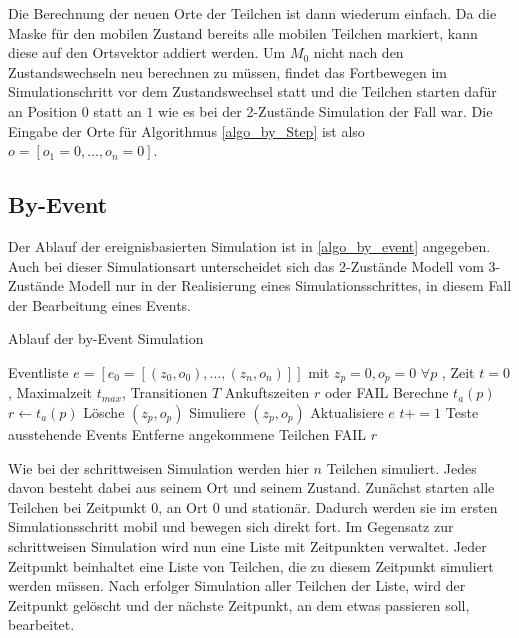 Die Berechnung der neuen Orte der Teilchen ist dann wiederum einfach. Da die Maske für den mobilen Zustand bereits alle mobilen Teilchen markiert, kann diese auf den Ortsvektor addiert werden. Um $M_0$ nicht nach den Zustandswechseln neu berechnen zu müssen, findet das Fortbewegen im Simulationschritt vor dem Zustandswechsel statt und die Teilchen starten dafür an Position $0$ statt an $1$ wie es bei der 2-Zustände Simulation der Fall war. Die Eingabe der Orte für Algorithmus \ref{algo_by_Step} ist also $o= [o_1 = 0, \ldots, o_n=0]$.




\subsection{By-Event}
Der Ablauf der ereignisbasierten Simulation ist in \ref{algo_by_event} angegeben. Auch bei dieser Simulationsart unterscheidet sich das 2-Zustände Modell vom 3-Zustände Modell nur in der Realisierung eines Simulationsschrittes, in diesem Fall der Bearbeitung eines Events.

\begin{algorithm}
\caption{Ablauf der by-Event Simulation}
\label{algo_by_event}
\begin{algorithmic}
\REQUIRE Eventliste $e= [e_0 = [(z_0, o_0), \ldots, (z_n, o_n)]]$ mit $z_p = 0, o_p = 0$ $\forall p$ , Zeit $t=0$, Maximalzeit $t_{max}$, Transitionen $T$
\ENSURE Ankuftszeiten $r$ oder FAIL
\STATE Berechne $t_a(p)$ 
\STATE $r \leftarrow t_a(p)$
\STATE Lösche $(z_p, o_p)$
\ELSE
\STATE Simuliere $(z_p, o_p)$
\STATE Aktualisiere $e$
\ENDIF
\ENDFOR
\STATE $t+=1$
\ENDWHILE
{}
\STATE Teste ausstehende Events
\STATE Entferne angekommene Teilchen
\RETURN FAIL
\ENDIF
\ENDIF
\RETURN $r$
\end{algorithmic}
\end{algorithm}


Wie bei der schrittweisen Simulation werden hier $n$ Teilchen simuliert. Jedes davon besteht dabei aus seinem Ort und seinem Zustand. 
Zunächst starten alle Teilchen bei Zeitpunkt $0$, an Ort $0$ und stationär. Dadurch werden sie im ersten Simulationsschritt mobil und bewegen sich direkt fort. 
Im Gegensatz zur schrittweisen Simulation wird nun eine Liste mit Zeitpunkten verwaltet. Jeder Zeitpunkt beinhaltet eine Liste von Teilchen, die zu diesem Zeitpunkt simuliert werden müssen. Nach erfolger Simulation aller Teilchen der Liste, wird der Zeitpunkt gelöscht und der nächste Zeitpunkt, an dem etwas passieren soll, bearbeitet.

